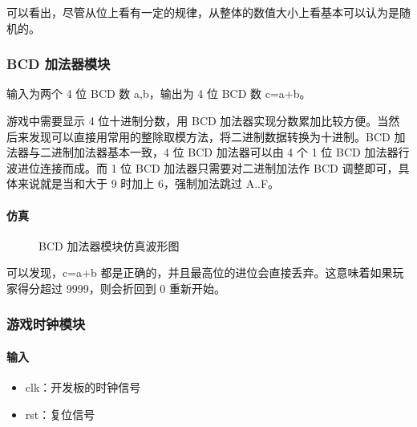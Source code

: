 \documentclass[hyperref,UTF8,12pt,a4paper]{ctexart}
\providecommand{\tightlist}{%
  \setlength{\itemsep}{0pt}\setlength{\parskip}{0pt}}
\begin{document}
可以看出，尽管从位上看有一定的规律，从整体的数值大小上看基本可以认为是随机的。

\hypertarget{bcd-ux52a0ux6cd5ux5668ux6a21ux5757}{%
\subsubsection{BCD
加法器模块}\label{bcd-ux52a0ux6cd5ux5668ux6a21ux5757}}

输入为两个 4 位 BCD 数 a,b，输出为 4 位 BCD 数 c=a+b。

游戏中需要显示 4 位十进制分数，用 BCD
加法器实现分数累加比较方便。当然后来发现可以直接用常用的整除取模方法，将二进制数据转换为十进制。BCD
加法器与二进制加法器基本一致，4 位 BCD 加法器可以由 4 个 1 位 BCD
加法器行波进位连接而成。而 1 位 BCD 加法器只需要对二进制加法作 BCD
调整即可，具体来说就是当和大于 9 时加上 6，强制加法跳过 A..F。

\hypertarget{ux4effux771f-3}{%
\paragraph{仿真}\label{ux4effux771f-3}}

\begin{figure}[H]
\centering
{}
\caption{BCD 加法器模块仿真波形图}
\end{figure}

可以发现，c=a+b
都是正确的，并且最高位的进位会直接丢弃。这意味着如果玩家得分超过
9999，则会折回到 0 重新开始。

\hypertarget{ux6e38ux620fux65f6ux949fux6a21ux5757}{%
\subsubsection{游戏时钟模块}\label{ux6e38ux620fux65f6ux949fux6a21ux5757}}

\hypertarget{ux8f93ux5165-8}{%
\paragraph{输入}\label{ux8f93ux5165-8}}

\begin{itemize}
\tightlist
\item
  clk：开发板的时钟信号
\item
  rst：复位信号
\end{itemize}
\end{document}
